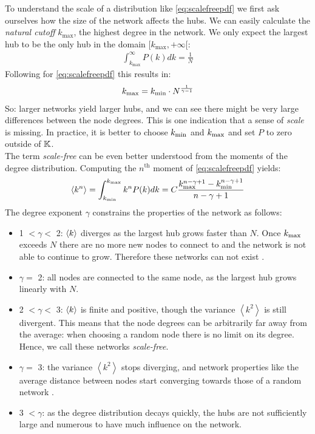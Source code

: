 To understand the scale of a distribution like \eqref{eq:scalefreepdf} we first ask ourselves how the size of the network affects the hubs. We can easily calculate the \textit{natural cutoff} $k_{\text{max}}$, the highest degree in the network. We only expect the largest hub to be the only hub in the domain $[k_{\text{max}}, +\infty[$:
\begin{align*}
\int_{k_{\text{max}}}^{\infty} P(k) dk=\frac{1}{N}
\end{align*}
Following \cite{BarabasiNetworkBook2016} for \eqref{eq:scalefreepdf} this results in:
\begin{align}
k_{\text{max}} = k_{\text{min}} \cdot N^{\frac{1}{\gamma-1}} \label{eq:scalefreecutoff}
\end{align}
So: larger networks yield larger hubs, and we can see there might be very large differences between the node degrees. This is one indication that a sense of \textsl{scale} is missing. In practice, it is better to choose $k_{\text{min}}$ and $k_{\text{max}}$ and set $P$ to zero outside of ${\mathbb{K}}$. \\

The term \textsl{scale-free} can be even better understood from the moments of the degree distribution. Computing the $n^{\text{th}}$ moment of \eqref{eq:scalefreepdf} yields:
\begin{align}
\left\langle k^{n}\right\rangle=\int_{\kmin}^{\kmax} k^{n} P(k) d k=C \frac{\kmax^{n-\gamma+1} - \kmin^{n-\gamma+1}}{n-\gamma+1}
\end{align}
The degree exponent $\gamma$ constrains the properties of the network as follows:
\begin{itemize}
\item 1 $< \gamma <$ 2: ${\langle k\rangle}$ diverges as the largest hub grows faster than $N$. Once $k_{\text{max}}$ exceeds $N$ there are no more new nodes to connect to and the network is not able to continue to grow. Therefore these networks can not exist \cite{Bassler2011, BarabasiNetworkBook2016}.
\item $\gamma =$ 2: all nodes are connected to the same node, as the largest hub grows linearly with $N$.
\item 2 $< \gamma < $ 3: ${\langle k\rangle}$ is finite and positive, though the variance $\left\langle k^{2}\right\rangle$ is still divergent. This means that the node degrees can be arbitrarily far away from the average: when choosing a random node there is no limit on its degree. Hence, we call these networks \textsl{scale-free}.
\item $ \gamma = $ 3: the variance $\left\langle k^{2}\right\rangle$ stops diverging, and network properties like the average distance between nodes start converging towards those of a random network \cite{BarabasiNetworkBook2016}.
\item 3 $< \gamma$: as the degree distribution decays quickly, the hubs are not sufficiently large and numerous to have much influence on the network. \end{itemize}


